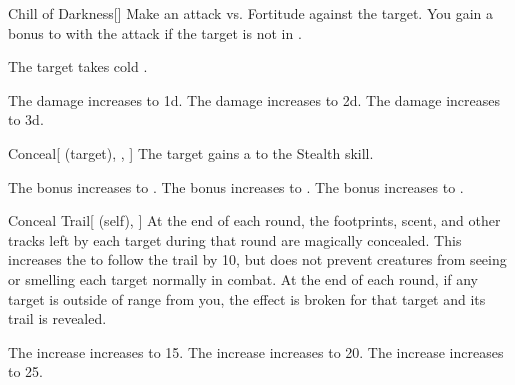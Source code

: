 \lowercase{\hypertarget{spell:Chill of Darkness}{}}\label{spell:Chill of Darkness}
\begin{freeability}[Rank 1]{\hypertarget{spell:Chill of Darkness}{Chill of Darkness}}[]
Make an attack vs. Fortitude against the target.
You gain a  bonus to  with the attack if the target is not in .

\hit The target takes cold .

\rankline
{} The damage increases to  \plus1d.
 The damage increases to  \plus2d.
 The damage increases to  \plus3d.
\end{freeability}
\vspace{0.25em}



\lowercase{\hypertarget{spell:Conceal}{}}\label{spell:Conceal}
\begin{attuneability}[Rank 1]{\hypertarget{spell:Conceal}{Conceal}}[ (target), , ]
The target gains a   to the Stealth skill.

\rankline
{} The bonus increases to .
 The bonus increases to .
 The bonus increases to .
\end{attuneability}
\vspace{0.25em}



\lowercase{\hypertarget{spell:Conceal Trail}{}}\label{spell:Conceal Trail}
\begin{attuneability}[Rank 1]{\hypertarget{spell:Conceal Trail}{Conceal Trail}}[ (self), ]
At the end of each round, the footprints, scent, and other tracks left by each target during that round are magically concealed.
This increases the  to follow the trail by 10, but does not prevent creatures from seeing or smelling each target normally in combat.
At the end of each round, if any target is outside of \rnglong range from you, the effect is broken for that target and its trail is revealed.

\rankline
{} The  increase increases to 15.
 The  increase increases to 20.
 The  increase increases to 25.
\end{attuneability}
\vspace{0.25em}



